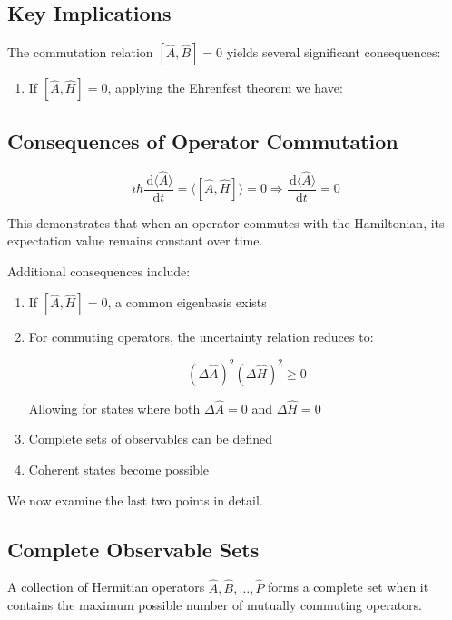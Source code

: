 \documentclass[italian]{HKNdocument}
\begin{document}
\subsection{Key Implications}
The commutation relation $[\hat{A}, \hat{B}]=0$ yields several significant consequences:

\begin{enumerate}
  \item If $[\hat{A}, \hat{H}]=0$, applying the Ehrenfest theorem we have:
\end{enumerate}


\subsection{Consequences of Operator Commutation}

\begin{equation}
i \hbar \frac{\, \mathrm{d}\langle\hat{A}\rangle}{\mathrm{d} t}=\langle[\hat{A}, \hat{H}]\rangle=0 \Longrightarrow \frac{\, \mathrm{d}\langle\hat{A}\rangle}{\mathrm{d} t}=0 \label{eq:7.36}
\end{equation}

This demonstrates that when an operator commutes with the Hamiltonian, its expectation value remains constant over time.

Additional consequences include:
\begin{enumerate}
  \item If $[\hat{A}, \hat{H}]=0$, a common eigenbasis exists
  \item For commuting operators, the uncertainty relation reduces to:

\begin{equation}
(\Delta \hat{A})^{2}(\Delta \hat{H})^{2} \geq 0 \label{eq:7.37}
\end{equation}

  Allowing for states where both $\Delta \hat{A}=0$ and $\Delta \hat{H}=0$
  \item Complete sets of observables can be defined
  \item Coherent states become possible
\end{enumerate}

We now examine the last two points in detail.

\subsection{Complete Observable Sets}
A collection of Hermitian operators $\hat{A}, \hat{B}, \ldots, \hat{P}$ forms a complete set when it contains the maximum possible number of mutually commuting operators.
\end{document}
